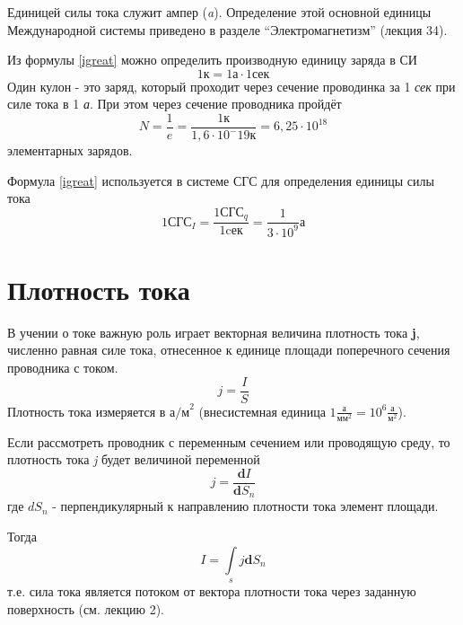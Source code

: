 \documentclass[a4paper,10pt]{book}
\begin{document}
Единицей силы тока служит ампер (\emph{a}). Определение этой основной единицы Международной системы приведено в разделе ``Электромагнетизм''
(лекция 34).

Из формулы \ref{igreat} можно определить производную единицу заряда в СИ
\begin{equation*}
 1 \text{к} = 1 \text{а} \cdot 1 \text{сек} 
\end{equation*}
Один кулон - это заряд, который проходит через сечение проводинка за 1 \emph{сек} при силе тока в 1 \emph{а}. При этом через сечение проводника пройдёт 
\begin{equation*}
 N = \frac{1}{e} = \frac{1 \text{к}}{1,6 \cdot 10^-19 \text{к}} = 6,25 \cdot 10^18 
\end{equation*}
элементарных зарядов.

Формула \ref{igreat} используется в системе СГС для определения единицы силы тока
\begin{equation}\label{sgsamp}
  1\text{СГС}_I = \frac{1\text{СГС}_q}{1 \text{cек}} = \frac{1}{3 \cdot 10^9} \text{а}
\end{equation}
\section{Плотность тока}
В учении о токе важную роль играет векторная величина плотность тока \textbf{j}, численно равная силе тока, отнесенное к единице площади поперечного сечения проводника с током.
\begin{equation}\label{ji}
 j = \frac{I}{S}
\end{equation}
Плотность тока измеряется в $\text{а/м}^2$ (внесистемная единица $1\frac{\text{а}}{\text{мм}^2} = 10^6\frac{\text{а}}{\text{м}^2}$).

Если рассмотреть проводник с переменным сечением или проводящую среду, то плотность тока \emph{j} будет величиной переменной
\begin{equation}\label{dencity}
 j = \frac{\mathbf{d}I}{\mathbf{d}S_n}
\end{equation}
где $dS_n$ - перпендикулярный к направлению плотности тока элемент площади.

Тогда
\begin{equation}\label{inti}
 I = \int\limits_{s}j\mathbf{d}S_n
\end{equation}
т.е. сила тока является потоком от вектора плотности тока через заданную поверхность (см. лекцию 2).
\end{document}
